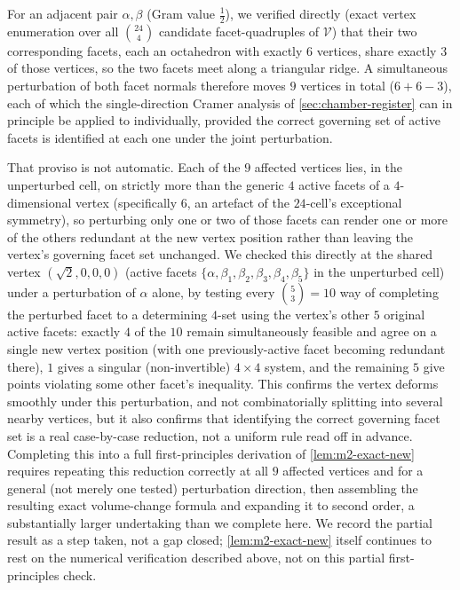 \documentclass[11pt,reqno]{amsart}
\renewcommand{\_}{\origunderscore\allowbreak}
\numberwithin{equation}{section}
\theoremstyle{plain}
\theoremstyle{definition}
\theoremstyle{remark}
\newcommand{\VCell}{\mathcal{V}}             %
\begin{document}
For an adjacent pair $\alpha,\beta$ (Gram value $\tfrac12$), we verified
directly (exact vertex enumeration over all $\binom{24}{4}$ candidate
facet-quadruples of $\VCell$) that their two corresponding facets, each an
octahedron with exactly $6$ vertices, share exactly $3$ of those
vertices, so the two facets meet along a triangular ridge. A simultaneous
perturbation of both facet normals therefore moves $9$ vertices in total
($6+6-3$), each of which the single-direction Cramer analysis of
\cref{sec:chamber-register} can in principle be applied to individually,
provided the correct governing set of active facets is identified at each
one under the joint perturbation.

That proviso is not automatic. Each of the $9$ affected vertices lies, in
the unperturbed cell, on strictly more than the generic $4$ active facets
of a $4$-dimensional vertex (specifically $6$, an artefact of the
$24$-cell's exceptional symmetry), so perturbing only one or two of those
facets can render one or more of the others redundant at the new vertex
position rather than leaving the vertex's governing facet set unchanged.
We checked this directly at the shared vertex $(\sqrt2,0,0,0)$ (active
facets $\{\alpha,\beta_1,\beta_2,\beta_3,\beta_4,\beta_5\}$ in the
unperturbed cell) under a perturbation of $\alpha$ alone, by testing every
$\binom53=10$ way of completing the perturbed facet to a determining
$4$-set using the vertex's other $5$ original active facets: exactly $4$
of the $10$ remain simultaneously feasible and agree on a single new
vertex position (with one previously-active facet becoming redundant
there), $1$ gives a singular (non-invertible) $4\times4$ system, and the
remaining $5$ give points violating some other facet's inequality. This
confirms the vertex deforms smoothly under this perturbation, and not combinatorially splitting into several nearby vertices, but it also
confirms that identifying the correct governing facet set is a real
case-by-case reduction, not a uniform rule read off in advance. Completing
this into a full first-principles derivation of \cref{lem:m2-exact-new}
requires repeating this reduction correctly at all $9$ affected vertices
and for a general (not merely one tested) perturbation direction, then
assembling the resulting exact volume-change formula and expanding it to
second order, a substantially larger undertaking than we complete here.
We record the partial result as a step taken, not a gap closed;
\cref{lem:m2-exact-new} itself continues to rest on the numerical
verification described above, not on this partial first-principles check.
\end{document}

